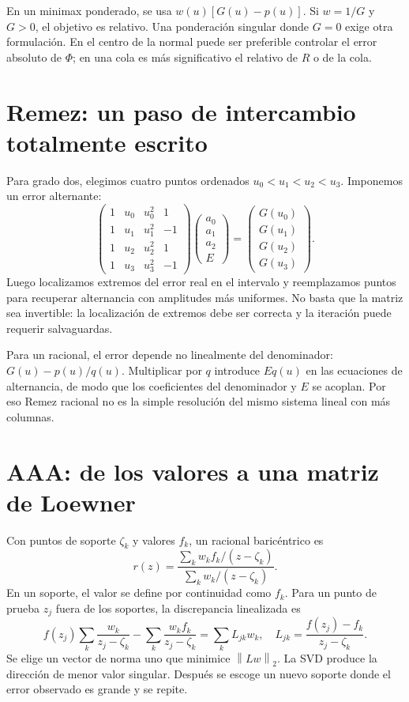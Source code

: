 \documentclass[11pt,a4paper]{article}
\newcommand{\E}{\mathbb E}
\newcommand{\norm}[1]{\left\lVert #1\right\rVert}
\theoremstyle{definition}
\begin{document}
En un minimax ponderado, se usa $w(u)[G(u)-p(u)]$.
Si $w=1/G$ y $G>0$, el objetivo es relativo.
Una ponderación singular donde $G=0$ exige otra formulación.
En el centro de la normal puede ser preferible controlar el error absoluto de $\Phi$; en una cola es más significativo el relativo de $R$ o de la cola.

\section{Remez: un paso de intercambio totalmente escrito}
Para grado dos, elegimos cuatro puntos ordenados $u_0<u_1<u_2<u_3$.
Imponemos un error alternante:
\[
\begin{pmatrix}
1&u_0&u_0^2&1\\
1&u_1&u_1^2&-1\\
1&u_2&u_2^2&1\\
1&u_3&u_3^2&-1
\end{pmatrix}
\begin{pmatrix}a_0\\a_1\\a_2\\E\end{pmatrix}
=
\begin{pmatrix}G(u_0)\\G(u_1)\\G(u_2)\\G(u_3)\end{pmatrix}.
\]
Luego localizamos extremos del error real en el intervalo y reemplazamos puntos para recuperar alternancia con amplitudes más uniformes.
No basta que la matriz sea invertible: la localización de extremos debe ser correcta y la iteración puede requerir salvaguardas.

Para un racional, el error depende no linealmente del denominador:
$G(u)-p(u)/q(u)$.
Multiplicar por $q$ introduce $E q(u)$ en las ecuaciones de alternancia, de modo que los coeficientes del denominador y $E$ se acoplan.
Por eso Remez racional no es la simple resolución del mismo sistema lineal con más columnas.

\section{AAA: de los valores a una matriz de Loewner}
Con puntos de soporte $\zeta_k$ y valores $f_k$, un racional baricéntrico es
\[
r(z)=\frac{\sum_k w_k f_k/(z-\zeta_k)}
{\sum_k w_k/(z-\zeta_k)}.
\]
En un soporte, el valor se define por continuidad como $f_k$.
Para un punto de prueba $z_j$ fuera de los soportes, la discrepancia linealizada es
\[
f(z_j)\sum_k\frac{w_k}{z_j-\zeta_k}
-\sum_k\frac{w_kf_k}{z_j-\zeta_k}
=\sum_kL_{jk}w_k,
\quad
L_{jk}=\frac{f(z_j)-f_k}{z_j-\zeta_k}.
\]
Se elige un vector de norma uno que minimice $\norm{Lw}_2$.
La SVD produce la dirección de menor valor singular.
Después se escoge un nuevo soporte donde el error observado es grande y se repite.
\end{document}
